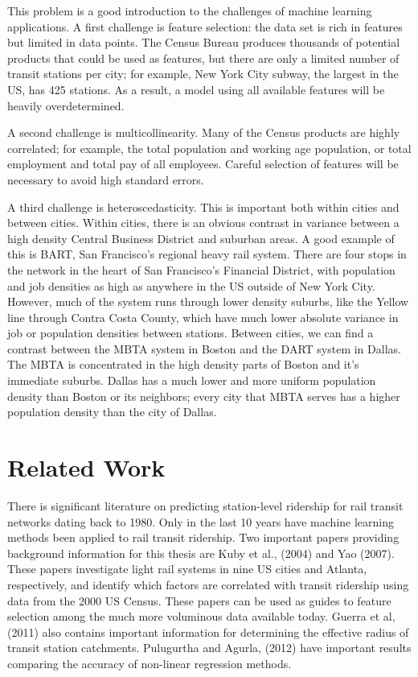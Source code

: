 \documentclass{article}
\begin{document}
This problem is a good introduction to the challenges of machine learning applications. A first challenge is feature selection: the data set is rich in features but limited in data points. The Census Bureau produces thousands of potential products that could be used as features, but there are only a limited number of transit stations per city; for example, New York City subway, the largest in the US, has 425 stations. As a result, a model using all available features will be heavily overdetermined. 

A second challenge is multicollinearity. Many of the Census products are highly correlated; for example, the total population and working age population, or total employment and total pay of all employees. Careful selection of features will be necessary to avoid high standard errors. 

A third challenge is heteroscedasticity. This is important both within cities and between cities. Within cities, there is an obvious contrast in variance between a high density Central Business District and suburban areas. A good example of this is BART, San Francisco's regional heavy rail system. There are four stops in the network in the heart of San Francisco's Financial District, with population and job densities as high as anywhere in the US outside of New York City. However, much of the system runs through lower density suburbs, like the Yellow line through Contra Costa County, which have much lower absolute variance in job or population densities between stations. Between cities, we can find a contrast between the MBTA system in Boston and the DART system in Dallas. The MBTA is concentrated in the high density parts of Boston and it's immediate suburbs. Dallas has a much lower and more uniform population density than Boston or its neighbors; every city that MBTA serves has a higher population density than the city of Dallas. 

\section{Related Work}

There is significant literature on predicting station-level ridership for rail transit networks dating back to 1980. Only in the last 10 years have machine learning methods been applied to rail transit ridership. Two important papers providing background information for this thesis are Kuby et al., (2004) and Yao (2007). These papers investigate light rail systems in nine US cities and Atlanta, respectively, and identify which factors are correlated with transit ridership using data from the 2000 US Census. These papers can be used as guides to feature selection among the much more voluminous data available today. Guerra et al, (2011) also contains important information for determining the effective radius of transit station catchments. Pulugurtha and Agurla, (2012) have important results comparing the accuracy of non-linear regression methods. 
\end{document}
